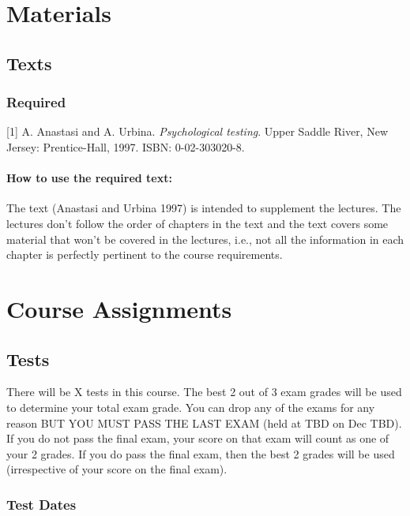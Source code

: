 \documentclass[11pt,]{article}
\begin{document}
\section{Materials}\label{materials}

\subsection{Texts}\label{texts}

\subsubsection{Required}\label{required}

{[}1{]} A. Anastasi and A. Urbina. \emph{Psychological testing}. Upper
Saddle River, New Jersey: Prentice-Hall, 1997. ISBN: 0-02-303020-8.

\paragraph{How to use the required
text:}\label{how-to-use-the-required-text}

The text (Anastasi and Urbina 1997) is intended to supplement the
lectures. The lectures don't follow the order of chapters in the text
and the text covers some material that won't be covered in the lectures,
i.e., not all the information in each chapter is perfectly pertinent to
the course requirements.

\section{Course Assignments}\label{course-assignments}

\subsection{Tests}\label{tests}

There will be X tests in this course. The best 2 out of 3 exam grades
will be used to determine your total exam grade. You can drop any of the
exams for any reason BUT YOU MUST PASS THE LAST EXAM (held at TBD on Dec
TBD). If you do not pass the final exam, your score on that exam will
count as one of your 2 grades. If you do pass the final exam, then the
best 2 grades will be used (irrespective of your score on the final
exam).

\subsubsection{Test Dates}\label{test-dates}
\end{document}
